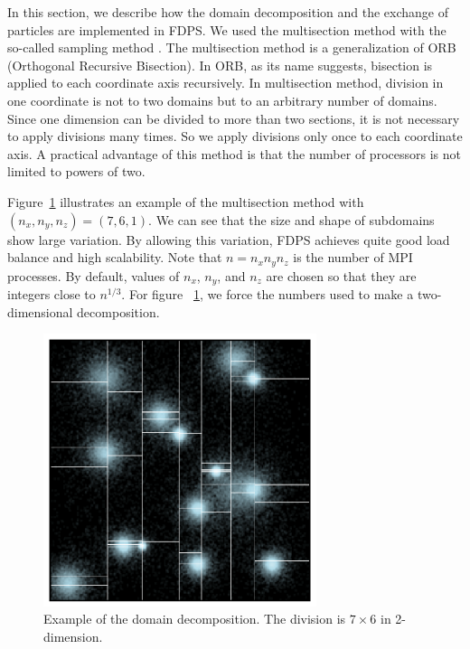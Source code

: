 In this section, we describe how the domain decomposition and the
exchange of particles are implemented in FDPS. We used the
multisection method
\citep{2004PASJ...56..521M} with the so-called sampling
method \citep{Blackston:1997:HPE:509593.509597}. The multisection
method is a generalization of ORB (Orthogonal Recursive Bisection). In
ORB, as its name suggests, bisection is applied to each coordinate
axis recursively. In multisection method, division in one coordinate
is not to two domains but to an arbitrary number of domains. Since one
dimension can be divided to more than two sections, it is not
necessary to apply divisions many times. So we apply divisions only
once to each coordinate axis. A practical advantage of this method is
that the number of processors is not limited to powers of two.

Figure~\ref{fig:decomposition} illustrates an example of the
multisection method with $(n_x, n_y, n_z)=(7,6,1)$. We can see that
the size and shape of subdomains show large variation. By allowing
this variation, FDPS achieves quite good load balance and high
scalability. Note that $n=n_x n_y n_z$ is the number of MPI
processes. By default, values of $n_x$, $n_y$, and $n_z$ are chosen so
that they are integers close to $n^{1/3}$. For figure
~\ref{fig:decomposition}, we force the numbers used to make a
two-dimensional decomposition.

\begin{figure}
  \begin{center}
    \includegraphics[width=8cm]{figure/pm3d.eps}
  \end{center}
  \caption{Example of the domain decomposition. The division is $7
    \times 6$ in 2-dimension.}
  \label{fig:decomposition}
\end{figure}


